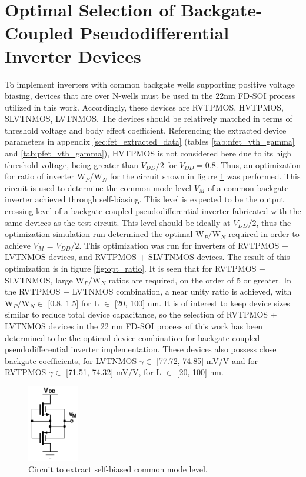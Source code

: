 	\FloatBarrier\section{Optimal Selection of Backgate-Coupled Pseudodifferential Inverter Devices}\label{sec:opt_wp_wn}
		To implement inverters with common backgate wells supporting positive voltage biasing, devices that are over N-wells must be used in the 22nm FD-SOI process utilized in this work. Accordingly, these devices are RVTPMOS, HVTPMOS, SLVTNMOS, LVTNMOS. The devices should be relatively matched in terms of threshold voltage and body effect coefficient. Referencing the extracted device parameters in appendix \ref{sec:fet_extracted_data} (tables \ref{tab:nfet_vth_gamma} and \ref{tab:pfet_vth_gamma}), HVTPMOS is not considered here due to its high threshold voltage, being greater than $V_{DD}/2$ for $V_{DD}=0.8$. Thus, an optimization for ratio of inverter W$_P$/W$_N$ for the circuit shown in figure \ref{fig:inv_vm} was performed. This circuit is used to determine the common mode level $V_{M}$ of a common-backgate inverter achieved through self-biasing. This level is expected to be the output crossing level of a backgate-coupled pseudodifferential inverter fabricated with the same devices as the test circuit. This level should be ideally at $V_{DD}/2$, thus the optimization simulation run determined the optimal W$_P$/W$_N$ required in order to achieve $V_{M}$ = $V_{DD}/2$. This optimization was run for inverters of RVTPMOS + LVTNMOS devices, and RVTPMOS + SLVTNMOS devices. The result of this optimization is in figure \ref{fig:opt_ratio}. It is seen that for RVTPMOS + SLVTNMOS, large W$_P$/W$_N$ ratios are required, on the order of 5 or greater. In the RVTPMOS + LVTNMOS combination, a near unity ratio is achieved, with W$_P$/W$_N \in$ [0.8, 1.5] for L $\in$ [20, 100] nm. It is of interest to keep device sizes similar to reduce total device capacitance, so the selection of RVTPMOS + LVTNMOS devices in the 22 nm FD-SOI process of this work has been determined to be the optimal device combination for backgate-coupled pseudodifferential inverter implementation. These devices also possess close backgate coefficients, for LVTNMOS $\gamma \in$ [77.72, 74.85] mV/V and for RVTPMOS $\gamma \in$ [71.51, 74.32] mV/V, for L $\in$ [20, 100] nm. 

			\begin{figure}[htb!]
			        \centering
			        \includegraphics[width=0.2\textwidth, angle=0]{./figs/design/inv_vm}
			    \caption{Circuit to extract self-biased common mode level.}
			    \label{fig:inv_vm}
			\end{figure}

